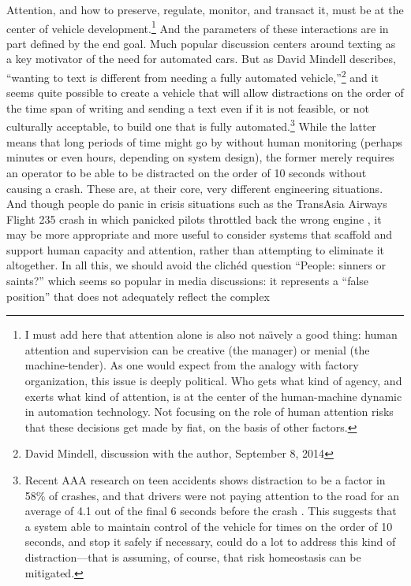 Attention, and how to preserve, regulate, monitor, and transact it,
must be at the center of vehicle development.\footnote{I must add here
that attention alone is also not na\"{\i}vely a good thing:
human attention and supervision can be creative (the manager) or
menial (the machine-tender). As one would expect from the analogy with
factory organization, this issue is deeply political. Who gets what
kind of agency, and exerts what kind of attention, is at the center of
the human-machine dynamic in automation technology. Not focusing on
the role of human attention risks that these decisions get made
by fiat, on the basis of other factors.} And the parameters of
these interactions are in part defined by the end goal. Much popular
discussion centers around texting as a key motivator of the need for
automated cars. But as 
David Mindell describes, ``wanting to text is different
from needing a fully automated vehicle,''\footnote{David Mindell,
  discussion with the author, September 8, 2014} and it seems quite possible
to create a vehicle that will allow distractions on the order of the
time span of writing and sending a text even if it is not feasible, or
not culturally acceptable, to build one that is fully
automated.\footnote{Recent AAA research on teen accidents shows
  distraction to be a factor in 58\% of crashes, and that drivers were
not paying attention to the road for an average of 4.1 out of the
final 6 seconds before the crash \cite{greenDistraction}. This
suggests that a system able to 
maintain control of the vehicle for times on the order of 10 seconds,
and stop it safely if necessary, could do a lot to address this kind
of distraction---that is assuming, of course, that risk homeostasis
can be mitigated.} While
the latter means that long periods of time might go by without human
monitoring (perhaps minutes or even hours, depending on system
design), the former merely requires an operator to be able to be 
distracted on the order of 10 seconds without causing a crash. These
are, at their core, very different engineering situations. And though
people do panic in crisis situations such as the TransAsia Airways
Flight 235 crash in which panicked pilots throttled back the wrong
engine \cite{wiseFear},
it may be more appropriate and more useful to consider systems 
that scaffold and support human capacity and attention, rather than
attempting to eliminate it altogether. In
all this, we should avoid the clich\'{e}d question ``People: sinners
or saints?'' which seems so popular in media discussions: it represents
a ``false position'' that does not adequately reflect the complex
